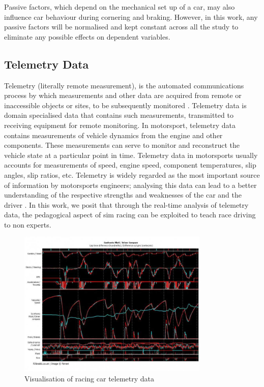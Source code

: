 Passive factors, which depend on the mechanical set up of a car, may also influence car behaviour during cornering and braking. However, in this work, any passive factors will be normalised and kept constant across all the study to eliminate any possible effects on dependent variables. 

\subsection{Telemetry Data}
Telemetry (literally remote measurement), is the automated communications process by which measurements and other data are acquired from remote or inaccessible objects or sites, to be subsequently monitored \cite{nasaTelemetry}. Telemetry data is domain specialised data that contains such measurements, transmitted to receiving equipment for remote monitoring. In motorsport, telemetry data contains measurements of vehicle dynamics from the engine and other components. These measurements can serve to monitor and reconstruct the vehicle state at a particular point in time. Telemetry data in motorsports usually accounts for measurements of speed, engine speed, component temperatures, slip angles, slip ratios, etc. Telemetry is widely regarded as the most important source of information by motorsports engineers; analysing this data can lead to a better understanding of the respective strengths and weaknesses of the car and the driver \cite{CarDataAnalysis}. In this work, we posit that through the real-time analysis of telemetry data, the pedagogical aspect of sim racing can be exploited to teach race driving to non experts.  

\begin{figure}[!htb]
	\centering
	\includegraphics[height=7cm]{charts/telemetrydata.jpg}
	\caption{Visualisation of racing car telemetry data}
	\label{fig:telemetrydata}
\end{figure}

